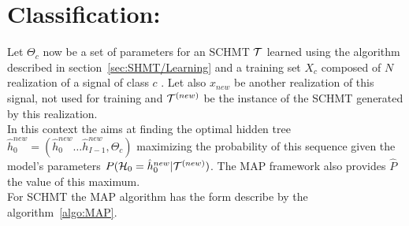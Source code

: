 \documentclass[a4paper,11pt]{report}
\begin{document}
  \section{Classification:}
    \label{sec:SHMT/Clf}
    
    Let $\Theta_{c}$ now be a set of parameters for an SCHMT $\mathcal{T}$ learned using the algorithm described in section~\ref{sec:SHMT/Learning} and a training set $X_{c}$ composed of $N$ realization of a signal of class $c$ . Let also $x_{new}$ be another realization of this signal, not used for training and $\mathcal{T}^{(new)}$ be the instance of the SCHMT generated by this realization.\\
    
    In this context the  aims at finding the optimal hidden tree $\hat{h}_{0}^{new}=(\hat{h}_{0}^{new} \dots \hat{h}_{I-1}^{new},\Theta_{c})$ maximizing the probability of this sequence given the model's parameters $P(\mathcal{H}_{0}= \hat{h}_{0}^{new}|\mathcal{T}^{(new)})$. The MAP framework also provides $\hat{P}$ the value of this maximum.\\
    
    For SCHMT the MAP algorithm has the form describe by the algorithm~\ref{algo:MAP}.
    
\end{document}
